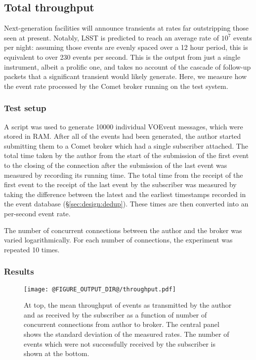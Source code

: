 \documentclass[5p,authoryear]{elsarticle}
\begin{document}
\subsection{Total throughput}
\label{sec:perf:total}

Next-generation facilities will announce transients at rates far outstripping
those seen at present. Notably, LSST is predicted to reach an average rate of
$10^7$ events per night: assuming those events are evenly spaced over a 12
hour period, this is equivalent to over 230 events per second. This is the
output from just a single instrument, albeit a prolific one, and takes no
account of the cascade of follow-up packets that a significant transient would
likely generate. Here, we measure how the event rate processed by the Comet
broker running on the test system.

\subsubsection{Test setup}
\label{sec:perf:total:setup}

A script was used to generate 10000 individual VOEvent messages, which were
stored in RAM\@. After all of the events had been generated, the author
started submitting them to a Comet broker which had a single subscriber
attached. The total time taken by the author from the start of the submission
of the first event to the closing of the connection after the submission of
the last event was measured by recording its running time. The total time from
the receipt of the first event to the receipt of the last event by the
subscriber was measured by taking the difference between the latest and the
earliest timestamps recorded in the event database (\S\ref{sec:design:dedup}).
These times are then converted into an per-second event rate.

The number of concurrent connections between the author and the broker was
varied logarithmically. For each number of connections, the experiment was
repeated 10 times.

\subsubsection{Results}
\label{sec:perf:total:results}

\begin{figure}
  \begin{center}
  \texttt{[image: @FIGURE\_OUTPUT\_DIR@/throughput.pdf]}
  \end{center}

  \caption{At top, the mean throughput of events as transmitted by
  the author and as received by the subscriber as a function of number of
  concurrent connections from author to broker. The central panel shows the
  standard deviation of the measured rates. The number of events which were
  not successfully received by the subscriber is shown at the bottom.}

  \label{fig:throughput}
\end{figure}
\end{document}
